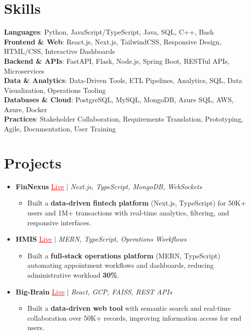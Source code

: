 \documentclass[letterpaper,10pt]{article}
\newcommand{\resumeItem}[1]{\item\small{{#1 \vspace{-2pt}}}}
\newcommand{\resumeProjectHeading}[1]{\item \small #1 \vspace{-2pt}}
\newcommand{\resumeSubHeadingListStart}{\begin{itemize}[leftmargin=0.0in, label={}]}
\newcommand{\resumeSubHeadingListEnd}{\end{itemize}}
\newcommand{\resumeProjItemListStart}{\begin{itemize}[leftmargin=0.15in,label=\textbullet,itemsep=0pt,topsep=0pt,parsep=0pt,partopsep=0pt]}
\newcommand{\resumeProjItemListEnd}{\end{itemize}\vspace{-4pt}}
\begin{document}
\section{Skills}
\begin{itemize}[leftmargin=0.15in, label={}]
\small{\item{
\textbf{Languages}: Python, JavaScript/TypeScript, Java, SQL, C++, Bash \\
\textbf{Frontend \& Web}: React.js, Next.js, TailwindCSS, Responsive Design, HTML/CSS, Interactive Dashboards \\
\textbf{Backend \& APIs}: FastAPI, Flask, Node.js, Spring Boot, RESTful APIs, Microservices \\
\textbf{Data \& Analytics}: Data-Driven Tools, ETL Pipelines, Analytics, SQL, Data Visualization, Operations Tooling \\
\textbf{Databases \& Cloud}: PostgreSQL, MySQL, MongoDB, Azure SQL, AWS, Azure, Docker \\
\textbf{Practices}: Stakeholder Collaboration, Requirements Translation, Prototyping, Agile, Documentation, User Training
}}
\end{itemize}
\vspace{-6pt}
\section{Projects}
\resumeSubHeadingListStart
\vspace{-2pt}
\resumeProjectHeading{\textbf{FinNexus} {\href{https://fin-nexus.vercel.app/}{\textcolor{red}{\underline{Live}}}} $|$ \emph{Next.js, TypeScript, MongoDB, WebSockets}}
\resumeProjItemListStart
\resumeItem{Built a \textbf{data-driven fintech platform} (Next.js, TypeScript) for 50K+ users and 1M+ transactions with real-time analytics, filtering, and responsive interfaces.}
\resumeProjItemListEnd
\vspace{3pt}
\resumeProjectHeading{\textbf{HMIS} {\href{https://hims-rouge.vercel.app/}{\textcolor{red}{\underline{Live}}}} $|$ \emph{MERN, TypeScript, Operations Workflows}}
\resumeProjItemListStart
\resumeItem{Built a \textbf{full-stack operations platform} (MERN, TypeScript) automating appointment workflows and dashboards, reducing administrative workload \textbf{30\%}.}
\resumeProjItemListEnd
\vspace{3pt}
\resumeProjectHeading{\textbf{Big-Brain} {\href{https://big-brain-pied.vercel.app/}{\textcolor{red}{\underline{Live}}}} $|$ \emph{React, GCP, FAISS, REST APIs}}
\resumeProjItemListStart
\resumeItem{Built a \textbf{data-driven web tool} with semantic search and real-time collaboration over 50K+ records, improving information access for end users.}
\resumeProjItemListEnd
\resumeSubHeadingListEnd
\end{document}

